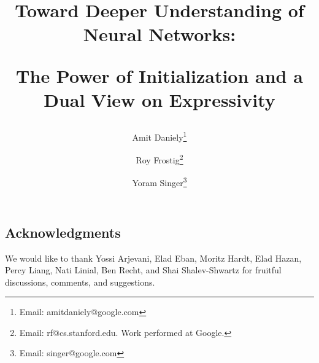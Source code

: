 \documentclass[12pt]{article}
\title{
 \begin{minipage}[c]{1.05\textwidth}
 	\centerline{Toward Deeper Understanding of Neural Networks:}
 	\centerline{The Power of Initialization and a Dual View on Expressivity}
 \end{minipage}
}
\author{
	\vspace{1cm}
  Amit Daniely\thanks{Email: amitdaniely@google.com} \and
  Roy Frostig\thanks{Email: rf@cs.stanford.edu. Work performed at Google.} \and
  Yoram Singer\thanks{Email: singer@google.com}
}
\newif\ifdraft
\begin{document}
\maketitle
\thispagestyle{empty}

\begin{abstract}

\end{abstract}

\ifdraft
\newpage

\fi

\newpage
\thispagestyle{empty}

{\large
{}
\vspace*{\fill}
\tableofcontents
\vspace*{\fill}
}

\newpage

\setcounter{page}{1}










\ifdraft
\appendix

\fi

\subsection*{Acknowledgments}
We would like to thank
Yossi Arjevani,
Elad Eban,
Moritz Hardt,
Elad Hazan,
Percy Liang,
Nati Linial,
Ben Recht, and
Shai Shalev-Shwartz
for fruitful discussions, comments, and suggestions.



\end{document}
